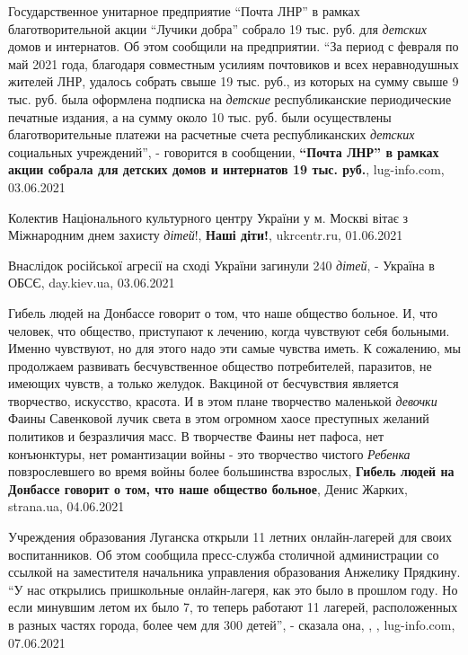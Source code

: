 Государственное унитарное предприятие \enquote{Почта ЛНР} в рамках
благотворительной акции \enquote{Лучики добра} собрало 19 тыс. руб. для \emph{детских}
домов и интернатов. Об этом сообщили на предприятии.  \enquote{За период с
февраля по май 2021 года, благодаря совместным усилиям почтовиков и всех
неравнодушных жителей ЛНР, удалось собрать свыше 19 тыс. руб., из которых на
сумму свыше 9 тыс. руб. была оформлена подписка на \emph{детские} республиканские
периодические печатные издания, а на сумму около 10 тыс. руб. были осуществлены
благотворительные платежи на расчетные счета республиканских \emph{детских} социальных
учреждений}, - говорится в сообщении,
\textbf{\enquote{Почта ЛНР} в рамках акции собрала для детских домов и интернатов 19 тыс. руб.},
lug-info.com, 03.06.2021

\begingroup
Колектив Національного культурного центру України у м. Москві вітає з
Міжнародним днем захисту \emph{дітей}!, 
\textbf{Наші діти!}, ukrcentr.ru, 01.06.2021

Внаслідок російської агресії на сході України загинули 240 \emph{дітей}, -
Україна в ОБСЄ, day.kiev.ua, 03.06.2021
\endgroup

Гибель людей на Донбассе говорит о том, что наше общество больное. И, что
человек, что общество, приступают к лечению, когда чувствуют себя больными.
Именно чувствуют, но для этого надо эти самые чувства иметь. К сожалению, мы
продолжаем развивать бесчувственное общество потребителей, паразитов, не
имеющих чувств, а только желудок.  Вакциной от бесчувствия является творчество,
искусство, красота. И в этом плане творчество маленькой \emph{девочки} Фаины
Савенковой лучик света в этом огромном хаосе преступных желаний политиков и
безразличия масс. В творчестве Фаины нет пафоса, нет конъюнктуры, нет
романтизации войны - это творчество чистого \emph{Ребенка} повзрослевшего во время
войны более большинства взрослых,
\textbf{Гибель людей на Донбассе говорит о том, что наше общество больное},
Денис Жарких, strana.ua, 04.06.2021

Учреждения образования Луганска открыли 11 летних онлайн-лагерей для своих
воспитанников. Об этом сообщила пресс-служба столичной администрации со ссылкой
на заместителя начальника управления образования Анжелику Прядкину.  \enquote{У нас
открылись пришкольные онлайн-лагеря, как это было в прошлом году. Но если
минувшим летом их было 7, то теперь работают 11 лагерей, расположенных в разных
частях города, более чем для 300 детей}, - сказала она,
, , lug-info.com, 07.06.2021

